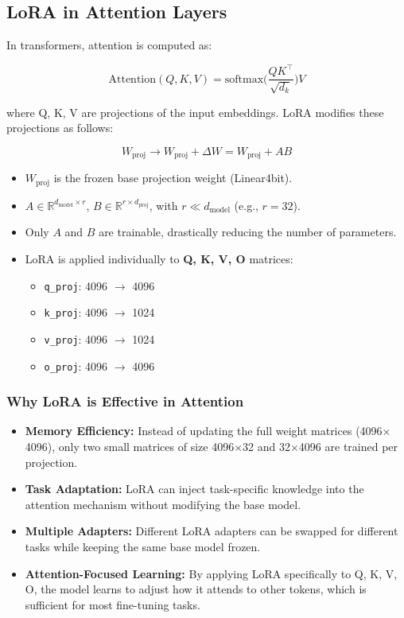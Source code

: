 \documentclass[a4paper, 12pt]{article}
\begin{document}
\subsection*{LoRA in Attention Layers}

In transformers, attention is computed as:

\[
\text{Attention}(Q,K,V) = \text{softmax}\Big(\frac{Q K^\top}{\sqrt{d_k}}\Big) V
\]

where Q, K, V are projections of the input embeddings. LoRA modifies these projections as follows:

\[
W_{\text{proj}} \rightarrow W_{\text{proj}} + \Delta W = W_{\text{proj}} + A B
\]

\begin{itemize}
    \item $W_{\text{proj}}$ is the frozen base projection weight (Linear4bit).
    \item $A \in \mathbb{R}^{d_{\text{model}} \times r}$, $B \in \mathbb{R}^{r \times d_{\text{proj}}}$, with $r \ll d_{\text{model}}$ (e.g., $r=32$).  
    \item Only $A$ and $B$ are trainable, drastically reducing the number of parameters.
    \item LoRA is applied individually to \textbf{Q, K, V, O} matrices:
        \begin{itemize}
            \item \texttt{q\_proj}: 4096 $\rightarrow$ 4096
            \item \texttt{k\_proj}: 4096 $\rightarrow$ 1024
            \item \texttt{v\_proj}: 4096 $\rightarrow$ 1024
            \item \texttt{o\_proj}: 4096 $\rightarrow$ 4096
        \end{itemize}
\end{itemize}

\subsubsection*{Why LoRA is Effective in Attention}

\begin{itemize}
    \item \textbf{Memory Efficiency:} Instead of updating the full weight matrices (4096$\times$4096), only two small matrices of size 4096$\times$32 and 32$\times$4096 are trained per projection.
    \item \textbf{Task Adaptation:} LoRA can inject task-specific knowledge into the attention mechanism without modifying the base model.
    \item \textbf{Multiple Adapters:} Different LoRA adapters can be swapped for different tasks while keeping the same base model frozen.
    \item \textbf{Attention-Focused Learning:} By applying LoRA specifically to Q, K, V, O, the model learns to adjust how it attends to other tokens, which is sufficient for most fine-tuning tasks.
\end{itemize}
\end{document}

